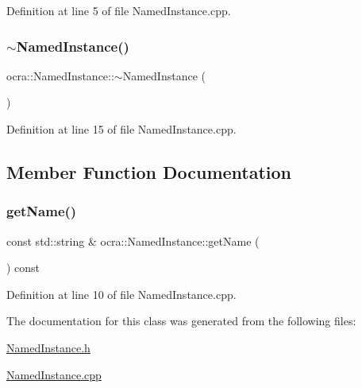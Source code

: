 Definition at line 5 of file Named\+Instance.\+cpp.

\hypertarget{classocra_1_1NamedInstance_a0caaa1040def535f34f527b7f7f590cf}{}\label{classocra_1_1NamedInstance_a0caaa1040def535f34f527b7f7f590cf} 
\subsubsection{\texorpdfstring{$\sim$\+Named\+Instance()}{~NamedInstance()}}
{\footnotesize\ttfamily ocra\+::\+Named\+Instance\+::$\sim$\+Named\+Instance (\begin{DoxyParamCaption}{ }\end{DoxyParamCaption})\hspace{0.3cm}{\ttfamily [virtual]}}



Definition at line 15 of file Named\+Instance.\+cpp.



\subsection{Member Function Documentation}
\hypertarget{classocra_1_1NamedInstance_a8ef1a2cbd11f1308774eff3f61c53ae1}{}\label{classocra_1_1NamedInstance_a8ef1a2cbd11f1308774eff3f61c53ae1} 
\subsubsection{\texorpdfstring{get\+Name()}{getName()}}
{\footnotesize\ttfamily const std\+::string \& ocra\+::\+Named\+Instance\+::get\+Name (\begin{DoxyParamCaption}{ }\end{DoxyParamCaption}) const}



Definition at line 10 of file Named\+Instance.\+cpp.



The documentation for this class was generated from the following files\+:\begin{DoxyCompactItemize}
\item 
\hyperlink{NamedInstance_8h}{Named\+Instance.\+h}\item 
\hyperlink{NamedInstance_8cpp}{Named\+Instance.\+cpp}\end{DoxyCompactItemize}

